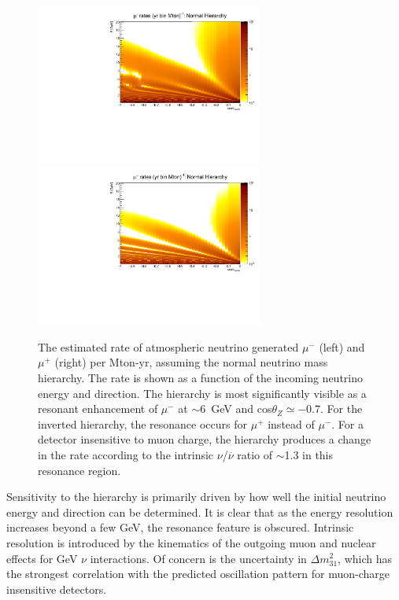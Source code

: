 \begin{figure}[tbp]
\begin{center}
\includegraphics[width=7.5cm]{KBL/muRates_NH_MtonYr.pdf}
\includegraphics[width=7.5cm]{KBL/antiMuRates_NH_MtonYr.pdf}
\caption{The estimated rate of atmospheric neutrino generated $\mu^-$
  (left) and $\mu^+$ (right) per Mton-yr, assuming the normal neutrino
  mass hierarchy.  The rate is shown as a function of the incoming
  neutrino energy and direction.  The hierarchy is most significantly
  visible as a resonant enhancement of $\mu^-$ at $\sim$6~GeV and
  cos$\theta_Z\simeq -0.7$.  For the inverted hierarchy, the resonance
  occurs for $\mu^+$ instead of $\mu^-$.  For a detector insensitive
  to muon charge, the hierarchy produces a change in the rate
  according to the intrinsic $\nu$/$\overline{\nu}$ ratio of $\sim$1.3
  in this resonance region.}
\label{fig:atmoMuRates}
\end{center}
\end{figure}

Sensitivity to the hierarchy is primarily driven by how well the
initial neutrino energy and direction can be determined.  It is clear
that as the energy resolution increases beyond a few GeV, the
resonance feature is obscured.  Intrinsic resolution is introduced by
the kinematics of the outgoing muon and nuclear effects for GeV $\nu$
interactions.   Of concern is the uncertainty in
${\Delta}m^{2}_{31}$, which has the strongest correlation with the
predicted oscillation pattern for muon-charge insensitive detectors.

